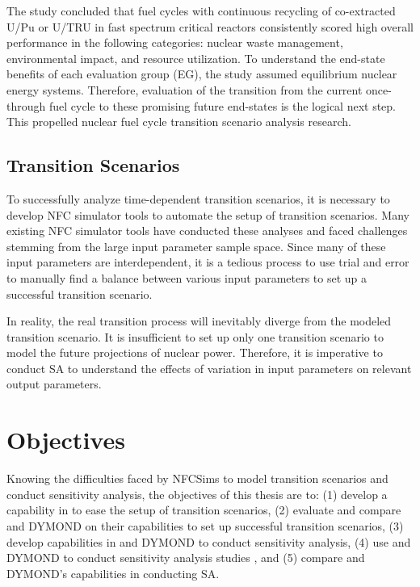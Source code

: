 The study concluded that fuel cycles with continuous recycling
of co-extracted U/Pu or U/TRU in fast spectrum critical reactors
consistently scored high overall performance in the following 
categories: nuclear waste management, environmental impact, 
and resource utilization. 
To understand the end-state benefits of each evaluation group (EG), 
the study assumed equilibrium nuclear energy systems. 
Therefore, evaluation of the transition from the current 
once-through fuel cycle to these promising 
future end-states \cite{feng_standardized_2016} 
is the logical next step. 
This propelled nuclear fuel cycle transition 
scenario analysis research. 

\subsection{Transition Scenarios}
To successfully analyze time-dependent transition
scenarios, it is necessary to develop \gls{NFC} simulator tools to  
automate the setup of transition scenarios. 
Many existing \gls{NFC} simulator tools have conducted 
these analyses \cite{feng_standardized_2016,bae_standardized_2019,coquelet-pascal_cosi6:_2015}
and faced challenges stemming from the large input parameter
sample space.
Since many of these input parameters are interdependent, it is 
a tedious process to use trial and error to manually find a balance 
between various input parameters to set up a successful transition 
scenario. 
 
In reality, the real transition process will 
inevitably diverge from the modeled transition scenario. 
It is insufficient to set up only one transition scenario to model 
the future projections of nuclear power.
Therefore, it is imperative to conduct \gls{SA} to understand 
the effects of variation in input parameters on 
relevant output parameters. 

\section{Objectives}
Knowing the difficulties faced by \glspl{NFCSim} to model 
transition scenarios and conduct sensitivity analysis, 
the objectives of this thesis are to: 
(1) develop a capability in \Cyclus to ease the setup of 
transition scenarios, 
(2) evaluate and compare \Cyclus and 
DYMOND on their capabilities to set up 
successful transition scenarios,
(3) develop capabilities in \Cyclus and DYMOND to conduct 
sensitivity analysis,
(4) use \Cyclus and DYMOND to conduct sensitivity analysis studies
, and
(5) compare \Cyclus and DYMOND's capabilities in conducting \gls{SA}. 
